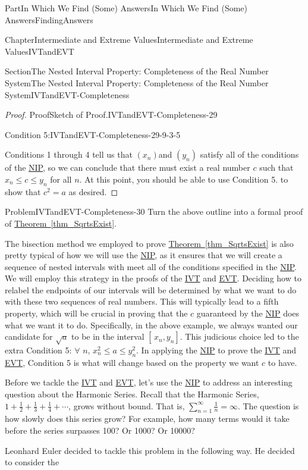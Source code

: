 \documentclass[oneside,10pt,]{book}
\newcommand{\xreffont}{\relax}
\numberwithin{equation}{part}
\begin{document}
\begin{partptx}{Part}{In Which We Find (Some) Answers}{}{In Which We Find (Some) Answers}{}{}{FindingAnswers}
\begin{chapterptx}{Chapter}{Intermediate and Extreme Values}{}{Intermediate and Extreme Values}{}{}{IVTandEVT}
\begin{sectionptx}{Section}{The Nested Interval Property: Completeness of the Real Number System}{}{The Nested Interval Property: Completeness of the Real Number System}{}{}{IVTandEVT-Completeness}
\begin{proof}{Proof}{Sketch of Proof.}{IVTandEVT-Completeness-29}
\begin{descriptionlist}
\begin{dlimedium}{Condition 5:}{IVTandEVT-Completeness-29-9-3-5}
%
\end{dlimedium}%
\end{descriptionlist}
%
\par
Conditions 1 through 4 tell us that \(\left(x_n\right)\)and \(\left(y_n\right)\) satisfy all of the conditions of the \hyperref[NIP]{NIP}, so we can conclude that there must exist a real number \(c\) such that \(x_n\leq c\leq y_n\) for all \(n\). At this point, you should be able to use Condition 5. to show that \(c^2=a\) as desired.%
\end{proof}
\begin{problem}{Problem}{}{IVTandEVT-Completeness-30}%
Turn the above outline into a formal proof of \hyperref[thm_SqrtsExist]{Theorem~{\xreffont\ref{thm_SqrtsExist}}}.%
\end{problem}
The bisection method we employed to prove \hyperref[thm_SqrtsExist]{Theorem~{\xreffont\ref{thm_SqrtsExist}}} is also pretty typical of how we will use the \hyperref[NIP]{NIP}, as it ensures that we will create a sequence of nested intervals with meet all of the conditions specified in the \hyperref[NIP]{NIP}. We will employ this strategy in the proofs of the \hyperref[IntermediateValueTheorem]{IVT} and \hyperref[thm_EVT]{EVT}. Deciding how to relabel the endpoints of our intervals will be determined by what we want to do with these two sequences of real numbers.  This will typically lead to a fifth property, which will be crucial in proving that the \(c\) guaranteed by the \hyperref[NIP]{NIP} does what we want it to do. Specifically, in the above example, we always wanted our candidate for \(\sqrt{a}\) to be in the interval \([\,x_n,y_n]\).  This judicious choice led to the extra Condition 5: \(\forall\) \(n,\,x_n^2\leq a\leq y_n^2\). In applying the \hyperref[NIP]{NIP} to prove the \hyperref[IntermediateValueTheorem]{IVT} and \hyperref[thm_EVT]{EVT}, Condition 5 is what will change based on the property we want \(c\) to have.%
\par
{} Before we tackle the \hyperref[IntermediateValueTheorem]{IVT} and \hyperref[thm_EVT]{EVT}, let's use the \hyperref[NIP]{NIP} to address an interesting question about the Harmonic Series.   Recall that the Harmonic Series, \(1+\frac{1}{2}+\frac{1}{3}+\frac{1}{4}+\cdots\), grows without bound. That is, \(\sum_{n=1}^\infty\frac{1}{n}=\infty\).  The question is how slowly does this series grow?  For example, how many terms would it take before the series surpasses 100? Or 1000?  Or 10000?%
\par
{} Leonhard Euler decided to tackle this problem in the following way.  He decided to consider the%

\end{sectionptx}
\end{chapterptx}
\end{partptx}
\end{document}
